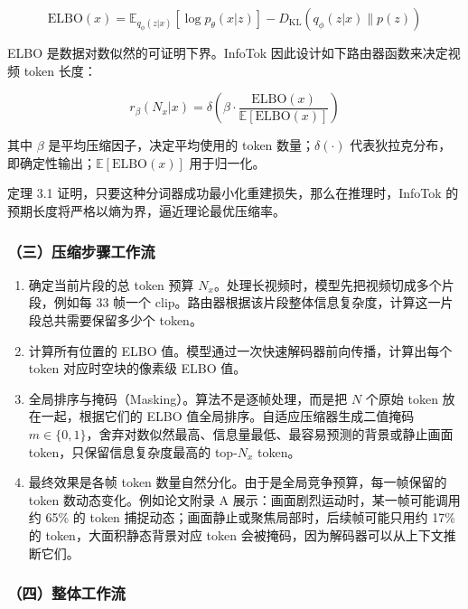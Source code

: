 \[
\mathrm{ELBO}(x) =
\mathbb{E}_{q_\phi(z|x)}[\log p_\theta(x|z)] -
D_{\mathrm{KL}}(q_\phi(z|x)\|p(z))
\]

ELBO 是数据对数似然的可证明下界。InfoTok 因此设计如下路由器函数来决定视频 token 长度：

\[
r_\beta(N_x|x) =
\delta\left(
\beta\cdot
\frac{\mathrm{ELBO}(x)}
{\mathbb{E}[\mathrm{ELBO}(x)]}
\right)
\]

其中 \(\beta\) 是平均压缩因子，决定平均使用的 token 数量；\(\delta(\cdot)\) 代表狄拉克分布，即确定性输出；\(\mathbb{E}[\mathrm{ELBO}(x)]\) 用于归一化。

定理 3.1 证明，只要这种分词器成功最小化重建损失，那么在推理时，InfoTok 的预期长度将严格以熵为界，逼近理论最优压缩率。

\hypertarget{ux4e09ux538bux7f29ux6b65ux9aa4ux5de5ux4f5cux6d41}{%
\subsubsection{（三）压缩步骤工作流}\label{ux4e09ux538bux7f29ux6b65ux9aa4ux5de5ux4f5cux6d41}}

\begin{enumerate}
\def\labelenumi{\arabic{enumi}.}
\tightlist
\item
  确定当前片段的总 token 预算 \(N_x\)。处理长视频时，模型先把视频切成多个片段，例如每 33 帧一个 clip。路由器根据该片段整体信息复杂度，计算这一片段总共需要保留多少个 token。
\item
  计算所有位置的 ELBO 值。模型通过一次快速解码器前向传播，计算出每个 token 对应时空块的像素级 ELBO 值。
\item
  全局排序与掩码（Masking）。算法不是逐帧处理，而是把 \(N\) 个原始 token 放在一起，根据它们的 ELBO 值全局排序。自适应压缩器生成二值掩码 \(m\in\{0,1\}\)，舍弃对数似然最高、信息量最低、最容易预测的背景或静止画面 token，只保留信息复杂度最高的 top-\(N_x\) token。
\item
  最终效果是各帧 token 数量自然分化。由于是全局竞争预算，每一帧保留的 token 数动态变化。例如论文附录 A 展示：画面剧烈运动时，某一帧可能调用约 65\% 的 token 捕捉动态；画面静止或聚焦局部时，后续帧可能只用约 17\% 的 token，大面积静态背景对应 token 会被掩码，因为解码器可以从上下文推断它们。
\end{enumerate}

\hypertarget{ux56dbux6574ux4f53ux5de5ux4f5cux6d41}{%
\subsubsection{（四）整体工作流}\label{ux56dbux6574ux4f53ux5de5ux4f5cux6d41}}

